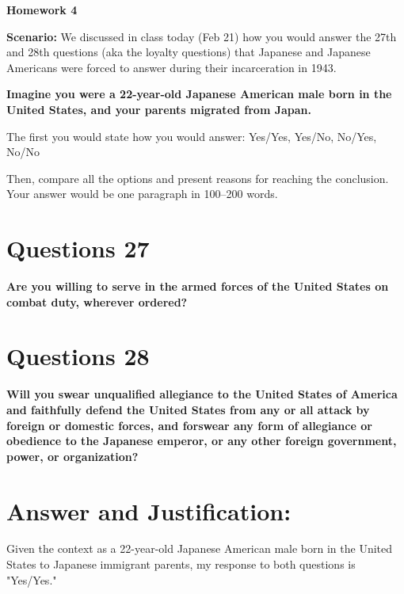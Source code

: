 \documentclass[12pt]{article}
\begin{document}
\begin{center}
  \Large \textbf{Homework 4}
\end{center}

\vspace{1em} %

\textbf{Scenario:} We discussed in class today (Feb 21) how you would answer the 27th and 28th questions (aka the loyalty questions) that Japanese and Japanese Americans were forced to answer during their incarceration in 1943.

\textbf{Imagine you were a 22-year-old Japanese American male born in the United States, and your parents migrated from Japan.}

The first you would state how you would answer: Yes/Yes, Yes/No, No/Yes, No/No

Then, compare all the options and present reasons for reaching the conclusion. Your answer would be one paragraph in 100–200 words.  
\section*{Questions 27}
\textbf{Are you willing to serve in the armed forces of the United States on
combat duty, wherever ordered?}

\section*{Questions 28}
\textbf{Will you swear unqualified allegiance to the United States of America
and faithfully defend the United States from any or all attack by foreign or
domestic forces, and forswear any form of allegiance or obedience to the
Japanese emperor, or any other foreign government, power, or organization?}


\section*{Answer and Justification:}

Given the context as a 22-year-old Japanese American male born in the United States to Japanese immigrant parents, my response to both questions is "Yes/Yes."
\end{document}
